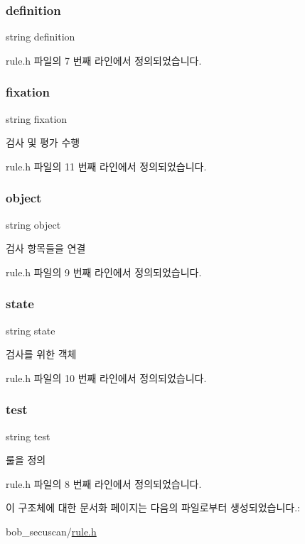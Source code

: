 \subsubsection{\texorpdfstring{definition}{definition}}
{\footnotesize\ttfamily string definition}



rule.\+h 파일의 7 번째 라인에서 정의되었습니다.

\mbox{\label{struct_rule_a580d700e40dd7c70ab0eea2a75335fb7}} 
\subsubsection{\texorpdfstring{fixation}{fixation}}
{\footnotesize\ttfamily string fixation}

검사 및 평가 수행 

rule.\+h 파일의 11 번째 라인에서 정의되었습니다.

\mbox{\label{struct_rule_aef723fe24b9b0acd063cb8cf7ba77ba1}} 
\subsubsection{\texorpdfstring{object}{object}}
{\footnotesize\ttfamily string object}

검사 항목들을 연결 

rule.\+h 파일의 9 번째 라인에서 정의되었습니다.

\mbox{\label{struct_rule_a565f287f7b2370aca4f019d143227c5f}} 
\subsubsection{\texorpdfstring{state}{state}}
{\footnotesize\ttfamily string state}

검사를 위한 객체 

rule.\+h 파일의 10 번째 라인에서 정의되었습니다.

\mbox{\label{struct_rule_a44865cab2ebf41957fd79a0ace31078b}} 
\subsubsection{\texorpdfstring{test}{test}}
{\footnotesize\ttfamily string test}

룰을 정의 

rule.\+h 파일의 8 번째 라인에서 정의되었습니다.



이 구조체에 대한 문서화 페이지는 다음의 파일로부터 생성되었습니다.\+:\begin{DoxyCompactItemize}
\item 
bob\+\_\+secuscan/\hyperlink{rule_8h}{rule.\+h}\end{DoxyCompactItemize}

